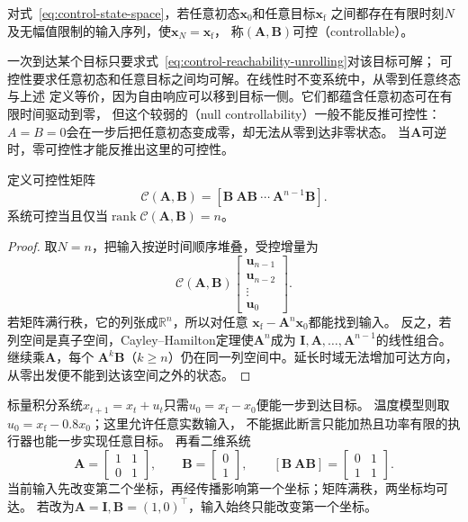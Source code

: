 \begin{definition}[可控性]
\label{def:control-controllability}
对式~\eqref{eq:control-state-space}，若任意初态$\bm x_0$和任意目标$\bm x_{\mathrm f}$
之间都存在有限时刻$N$及无幅值限制的输入序列，使$\bm x_N=\bm x_{\mathrm f}$，
称$(\bm A,\bm B)$可控（controllable）。
\end{definition}

一次到达某个目标只要求式~\eqref{eq:control-reachability-unrolling}对该目标可解；
可控性要求任意初态和任意目标之间均可解。在线性时不变系统中，从零到任意终态与上述
定义等价，因为自由响应可以移到目标一侧。它们都蕴含任意初态可在有限时间驱动到零，
但这个较弱的（null controllability）一般不能反推可控性：
$A=B=0$会在一步后把任意初态变成零，却无法从零到达非零状态。
当$\bm A$可逆时，零可控性才能反推出这里的可控性。

\begin{theorem}[Kalman可控性秩判据]
\label{thm:control-controllability-rank}
定义可控性矩阵
\begin{equation}
  \mathcal C(\bm A,\bm B)
  =[\bm B\ \bm A\bm B\ \cdots\ \bm A^{n-1}\bm B].
  \label{eq:control-controllability-matrix}
\end{equation}
系统可控当且仅当$\operatorname{rank}\mathcal C(\bm A,\bm B)=n$。
\end{theorem}
\begin{proof}
取$N=n$，把输入按逆时间顺序堆叠，受控增量为
\[
  \mathcal C(\bm A,\bm B)
  \begin{bmatrix}\bm u_{n-1}\\ \bm u_{n-2}\\ \vdots\\ \bm u_0\end{bmatrix}.
\]
若矩阵满行秩，它的列张成$\mathbb R^n$，所以对任意
$\bm x_{\mathrm f}-\bm A^n\bm x_0$都能找到输入。
反之，若列空间是真子空间，Cayley--Hamilton定理使$\bm A^n$成为
$\bm I,\bm A,\ldots,\bm A^{n-1}$的线性组合。继续乘$\bm A$，每个
$\bm A^k\bm B$（$k\geq n$）仍在同一列空间中。延长时域无法增加可达方向，
从零出发便不能到达该空间之外的状态。
\end{proof}

标量积分系统$x_{t+1}=x_t+u_t$只需$u_0=x_{\mathrm f}-x_0$便能一步到达目标。
温度模型则取$u_0=x_{\mathrm f}-0.8x_0$；这里允许任意实数输入，
不能据此断言只能加热且功率有限的执行器也能一步实现任意目标。
再看二维系统
\[
  \bm A=\begin{bmatrix}1&1\\0&1\end{bmatrix},
  \qquad \bm B=\begin{bmatrix}0\\1\end{bmatrix},
  \qquad
  [\bm B\ \bm A\bm B]=\begin{bmatrix}0&1\\1&1\end{bmatrix}.
\]
当前输入先改变第二个坐标，再经传播影响第一个坐标；矩阵满秩，两坐标均可达。
若改为$\bm A=\bm I,\bm B=(1,0)^\top$，输入始终只能改变第一个坐标。

